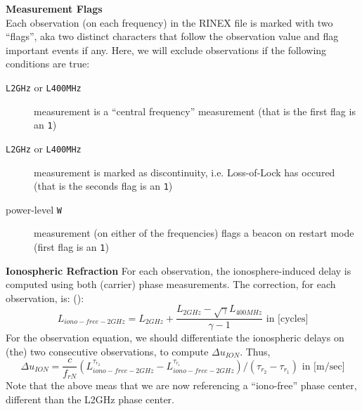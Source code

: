 \textbf{Measurement Flags}\\
\label{measurement-flags}
Each observation (on each frequency) in the RINEX file is marked with two ``flags'', 
aka two distinct characters that follow the observation value and flag important 
events if any. Here, we will exclude observations if the following conditions are true:
\begin{description}
  \item[\texttt{L2GHz} or \texttt{L400MHz}] measurement is a ``central frequency'' 
  measurement (that is the first flag is an \texttt{1})
  \item[\texttt{L2GHz} or \texttt{L400MHz}] measurement is marked as discontinuity, 
  i.e. Loss-of-Lock has occured (that is the seconds flag is an \texttt{1})
  \item[power-level \texttt{W}] measurement (on either of the frequencies) flags 
  a beacon on restart mode (first flag is an \texttt{1})
\end{description}

\textbf{Ionospheric Refraction}
\label{ionospheric-refraction}
For each observation, the ionosphere-induced delay is computed using both 
(carrier) phase measurements. The correction, for each observation, is: 
(\cite{lemoine-2016}):
\begin{equation}
  L_{iono-free-2GHz} = L_{2GHz} 
    + \frac{L_{2GHz} - \sqrt \gamma L_{400MHz}}{\gamma - 1} 
    \text{ in [cycles]}
\end{equation}
For the observation equation, we should differentiate the ionospheric delays on 
(the) two consecutive observations, to compute $\Delta u_{ION}$. Thus,
\begin{equation}
  \Delta u_{ION} = \frac{c}{f_{rN}} \left( L_{iono-free-2GHz}^{\tau_{r_2}} 
    - L_{iono-free-2GHz}^{\tau_{r_1}} \right) / (\tau_{r_2} - \tau_{r_1})
    \text{ in [m/sec]}
\end{equation}
Note that the above meas that we are now referencing a ``iono-free'' phase center, 
different than the L2GHz phase center.

